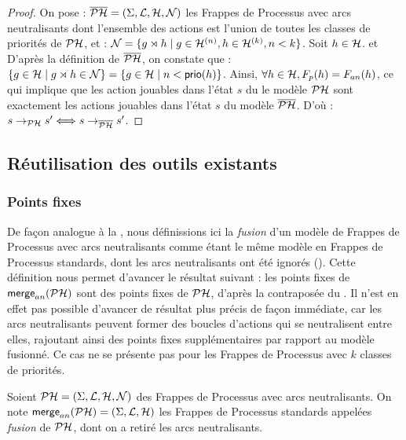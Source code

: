 \begin{proof}
  On pose : $\overline{\mathcal{PH}} = (\Sigma, \mathcal{L}, \mathcal{H}, \mathcal{N})$ les Frappes de Processus avec arcs neutralisants
  dont l'ensemble des actions est l'union de toutes les classes de priorités de $\mathcal{PH}$, et :
  $\mathcal{N} = \{ g\rtimes h \mid g \in \mathcal{H}^{(n)}, h \in \mathcal{H}^{(k)}, n < k \}$.
  Soit $h \in \mathcal{H}$. et
  D'après la définition de $\overline{\mathcal{PH}}$, on constate que :
  $\{ g \in \mathcal{H} \mid g\rtimes h \in \mathcal{N} \} = \{ g \in \mathcal{H} \mid n < \mathsf{prio}(h) \}$.
  Ainsi, $\forall h \in \mathcal{H}, F_{p}(h) = F_{an}(h)$,
  ce qui implique que les action jouables dans l'état $s$ du le modèle $\mathcal{PH}$
  sont exactement les actions jouables dans l'état $s$ du modèle $\overline{\mathcal{PH}}$.
  D'où : $s \rightarrow_{\mathcal{PH}} s' \Longleftrightarrow s \rightarrow_{\overline{\mathcal{PH}}} s'$.
\end{proof}



\subsection{Réutilisation des outils existants}



\subsubsection{Points fixes}

De façon analogue à la , nous définissions ici
la \emph{fusion} d'un modèle de Frappes de Processus avec arcs neutralisants
comme étant le même modèle en Frappes de Processus standards,
dont les arcs neutralisants ont été ignorés ().
Cette définition nous permet d'avancer le résultat suivant :
les points fixes de $\mathsf{merge}_{an}(\mathcal{PH})$ sont des points fixes de $\mathcal{PH}$,
d'après la contraposée du .
Il n'est en effet pas possible d'avancer de résultat plus précis de façon immédiate,
car les arcs neutralisants peuvent former des boucles d'actions qui se neutralisent entre elles,
rajoutant ainsi des points fixes supplémentaires par rapport au modèle fusionné.
Ce cas ne se présente pas pour les Frappes de Processus avec $k$ classes de priorités.

\begin{definition}
  Soient $\mathcal{PH} = (\Sigma, \mathcal{L}, \mathcal{H}, \mathcal{N})$ des Frappes de Processus avec arcs neutralisants.
  On note $\mathsf{merge}_{an}(\mathcal{PH}) = (\Sigma, \mathcal{L}, \mathcal{H})$
  les Frappes de Processus standards appelées \emph{fusion} de $\mathcal{PH}$,
  dont on a retiré les arcs neutralisants.
\end{definition}

